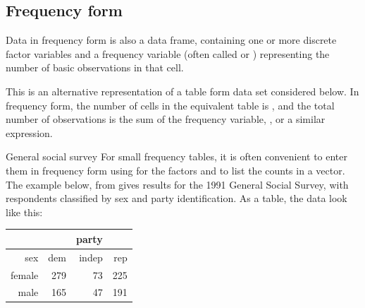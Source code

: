 \documentclass[10pt,krantz2]{krantz}\usepackage[]{graphicx}\usepackage[]{color}
\begin{document}
\subsection{Frequency form}
Data in frequency form is also a data frame, containing
one or more discrete factor variables and a frequency variable
(often called  or )
representing the number of basic observations in that cell.

This is an alternative representation of a table form data set considered
below.
In frequency form, the number of cells in the equivalent table
is , and the total number of observations
is the sum of the frequency variable, , %
  or a similar expression.

\begin{Example}[ch2-GSS]{General social survey}
For small frequency tables, it is often convenient to enter them in frequency form
using  for the factors and  to list the counts in a vector.
The example below, from \cite{Agresti:2002} gives results for the 1991 General Social Survey,
with respondents classified by sex and party identification.
As a table, the data look like this:
\begin{center}
\begin{tabular}{rrrr}
  \hline
    &     & party & \\
  \hline
sex & dem & indep & rep \\
  \hline
female & 279 & 73 & 225 \\
  male & 165 & 47 & 191 \\
   \hline
\end{tabular}
\end{center}



\end{Example}
\end{document}
